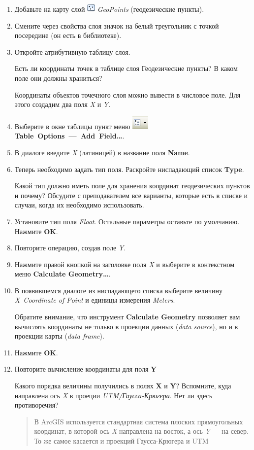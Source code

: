 \documentclass[]{book}
\theoremstyle{definition}
\theoremstyle{definition}
\theoremstyle{definition}
\theoremstyle{remark}
\begin{document}
\begin{enumerate}
\def\labelenumi{\arabic{enumi}.}
\item
  Добавьте на карту слой \includegraphics{images/Ex01/image7.png}
  \emph{GeoPoints} (геодезические пункты).
\item
  Смените через свойства слоя значок на белый треугольник с точкой
  посередине (он есть в библиотеке).
\item
  Откройте атрибутивную таблицу слоя.

  Есть ли координаты точек в таблице слоя Геодезические пункты? В каком
  поле они должны храниться?

  Координаты объектов точечного слоя можно вывести в числовое поле. Для
  этого создадим два поля \emph{X} и \emph{Y}.
\item
  Выберите в окне таблицы пункт меню
  \includegraphics{images/Ex01/image24.png}
  \textbf{Table~Options~---~Add~Field\ldots{}}.
\item
  В диалоге введите \emph{X} (латиницей) в название поля \textbf{Name}.
\item
  Теперь необходимо задать тип поля. Раскройте ниспадающий список
  \textbf{Type}.

  Какой тип должно иметь поле для хранения координат геодезических
  пунктов и почему? Обсудите с преподавателем все варианты, которые есть
  в списке и случаи, когда их необходимо использовать.
\item
  Установите тип поля \emph{Float}. Остальные параметры оставьте по
  умолчанию. Нажмите \textbf{OK}.
\item
  Повторите операцию, создав поле \emph{Y}.
\item
  Нажмите правой кнопкой на заголовке поля \emph{X} и выберите в
  контекстном меню \textbf{Calculate Geometry\ldots{}}.
\item
  В появившемся диалоге из ниспадающего списка выберите величину
  \emph{X~Coordinate of Point} и единицы измерения \emph{Meters}.

  Обратите внимание, что инструмент \textbf{Calculate Geometry}
  позволяет вам вычислять координаты не только в проекции данных
  (\emph{data source}), но и в проекции карты (\emph{data frame}).
\item
  Нажмите \textbf{OK}.
\item
  Повторите вычисление координаты для поля \textbf{Y}

  Какого порядка величины получились в полях \textbf{X} и \textbf{Y}?
  Вспомните, куда направлена ось \emph{X} в проеции
  \emph{UTM/Гаусса-Крюгера}. Нет ли здесь противоречия?

  \begin{quote}
  В ArcGIS используется стандартная система плоских прямоугольных
  координат, в которой ось \emph{X} направлена на восток, а ось \emph{Y}
  --- на север. То же самое касается и проекций Гаусса-Крюгера и UTM
  \end{quote}
\end{enumerate}
\end{document}
